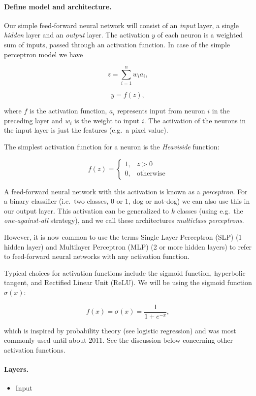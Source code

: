 \paragraph{Define model and architecture.}
Our simple feed-forward neural network will consist of an \emph{input} layer, a single \emph{hidden} layer and an \emph{output} layer. The activation $y$ of each neuron is a weighted sum of inputs, passed through an activation function. In case of the simple perceptron model we have 

$$ z = \sum_{i=1}^n w_i a_i ,$$

$$ y = f(z) ,$$

where $f$ is the activation function, $a_i$ represents input from neuron $i$ in the preceding layer
and $w_i$ is the weight to input $i$.  
The activation of the neurons in the input layer is just the features (e.g.~a pixel value).  

The simplest activation function for a neuron is the \emph{Heaviside} function:

$$ f(z) = 
\begin{cases}
1,  &  z > 0\\
0,  & \text{otherwise}
\end{cases}
$$

A feed-forward neural network with this activation is known as a \emph{perceptron}.  
For a binary classifier (i.e.~two classes, 0 or 1, dog or not-dog) we can also use this in our output layer.  
This activation can be generalized to $k$ classes (using e.g.~the \emph{one-against-all} strategy), 
and we call these architectures \emph{multiclass perceptrons}.  

However, it is now common to use the terms Single Layer Perceptron (SLP) (1 hidden layer) and  
Multilayer Perceptron (MLP) (2 or more hidden layers) to refer to feed-forward neural networks with any activation function.  

Typical choices for activation functions include the sigmoid function, hyperbolic tangent, and Rectified Linear Unit (ReLU).  
We will be using the sigmoid function $\sigma(x)$:  

$$ f(x) = \sigma(x) = \frac{1}{1 + e^{-x}} ,$$

which is inspired by probability theory (see logistic regression) and was most commonly used until about 2011. See the discussion below concerning other activation functions.

\paragraph{Layers.}
\begin{itemize}
\item Input 
\end{itemize}

